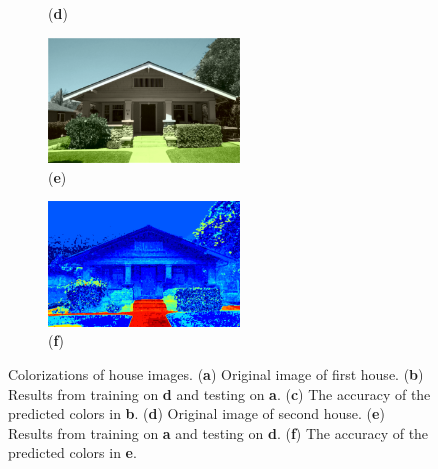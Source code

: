 \begin{figure}
\begin{subfigure}{2.1in}
        \caption{(\textbf{d})}
    \end{subfigure}
    \begin{subfigure}{2.1in}
        \centering
        \includegraphics[width=2in]{./Images/house2_colored.png}
        \caption{(\textbf{e})}
    \end{subfigure}
    \begin{subfigure}{2.1in}
        \centering
        \includegraphics[width=2in]{./Images/house2_acc.png}
        \caption{(\textbf{f})}
    \end{subfigure}
    \caption{Colorizations of house images. (\textbf{a}) Original image of first house. (\textbf{b}) Results from training on \textbf{d} and testing on \textbf{a}. (\textbf{c})  The accuracy of the predicted colors in \textbf{b}. (\textbf{d})  Original image of second house. (\textbf{e})  Results from training on \textbf{a} and testing on \textbf{d}. (\textbf{f})  The accuracy of the predicted colors in \textbf{e}.}
    \label{fig:houses}
\end{figure}

